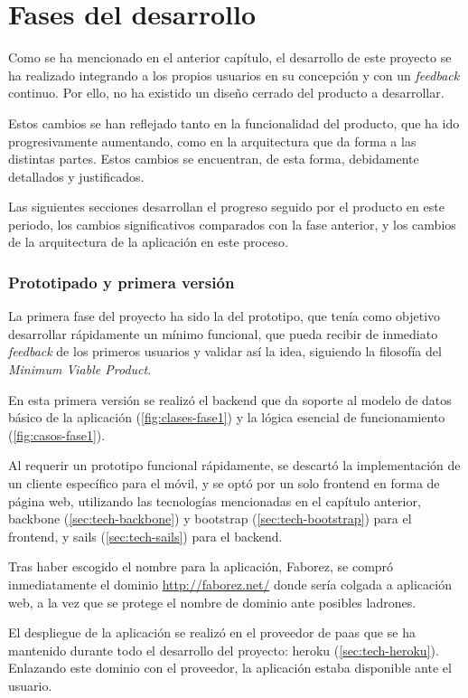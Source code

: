 \documentclass[main]{subfiles}
\begin{document}
\chapter{Fases del desarrollo}


Como se ha mencionado en el anterior capítulo, el desarrollo de este proyecto se ha realizado integrando a los propios usuarios en su concepción y con un \emph{feedback} continuo. Por ello, no ha existido un diseño cerrado del producto a desarrollar.

Estos cambios se han reflejado tanto en la funcionalidad del producto, que ha ido progresivamente aumentando, como en la arquitectura que da forma a las distintas partes. Estos cambios se encuentran, de esta forma, debidamente detallados y justificados.

Las siguientes secciones desarrollan el progreso seguido por el producto en este periodo, los cambios significativos comparados con la fase anterior, y los cambios de la arquitectura de la aplicación en este proceso.

\subsection{Prototipado y primera versión}

La primera fase del proyecto ha sido la del prototipo, que tenía como objetivo desarrollar rápidamente un mínimo funcional, que pueda recibir de inmediato \emph{feedback} de los primeros usuarios y validar así la idea, siguiendo la filosofía del \emph{Minimum Viable Product}\autocite{leanstartup}.

En esta primera versión se realizó el \gls{backend} que da soporte al modelo de datos básico de la aplicación (\cref{fig:clases-fase1}) y la lógica esencial de funcionamiento (\cref{fig:casos-fase1}).

Al requerir un prototipo funcional rápidamente, se descartó la implementación de un cliente específico para el móvil, y se optó por un solo frontend en forma de página web, utilizando las tecnologías mencionadas en el capítulo anterior, \gls{backbone} (\cref{sec:tech-backbone}) y \gls{bootstrap} (\cref{sec:tech-bootstrap}) para el \gls{frontend}, y \gls{sails} (\cref{sec:tech-sails}) para el \gls{backend}.




Tras haber escogido el nombre para la aplicación, Faborez, se compró inmediatamente el dominio \url{http://faborez.net/} donde sería colgada a aplicación web, a la vez que se protege el nombre de dominio ante posibles ladrones.

El despliegue de la aplicación se realizó en el proveedor de \gls{paas} que se ha mantenido durante todo el desarrollo del proyecto: \gls{heroku} (\cref{sec:tech-heroku}). Enlazando este dominio con el proveedor, la aplicación estaba disponible ante el usuario.
\end{document}
